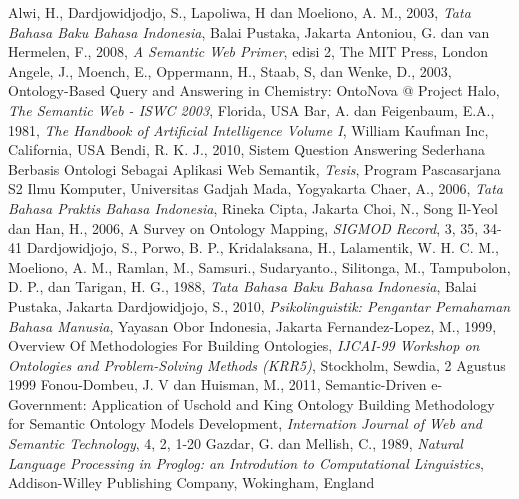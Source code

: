 \begin{thebibliography}{99}
		Alwi, H., Dardjowidjodjo, S., Lapoliwa, H dan Moeliono, A. M., 2003, \emph{Tata Bahasa Baku Bahasa Indonesia}, Balai Pustaka, Jakarta
		Antoniou, G. dan van Hermelen, F., 2008, \emph{A Semantic Web Primer}, edisi 2, The MIT Press, London
		Angele, J., Moench, E., Oppermann, H., Staab, S, dan Wenke, D., 2003, Ontology-Based Query and Answering in Chemistry: OntoNova @ Project Halo, \emph{The Semantic Web - ISWC 2003}, Florida, USA
		Bar, A. dan Feigenbaum, E.A., 1981, \emph{The Handbook of Artificial Intelligence Volume I}, William Kaufman Inc, California, USA
		Bendi, R. K. J., 2010, Sistem Question Answering Sederhana Berbasis Ontologi Sebagai Aplikasi Web Semantik, \emph{Tesis}, Program Pascasarjana S2 Ilmu Komputer, Universitas Gadjah Mada, Yogyakarta
		Chaer, A., 2006, \emph{Tata Bahasa Praktis Bahasa Indonesia}, Rineka Cipta, Jakarta
		Choi, N., Song Il-Yeol dan Han, H., 2006, A Survey on Ontology Mapping, \emph{SIGMOD Record}, 3, 35, 34-41
		Dardjowidjojo, S., Porwo, B. P., Kridalaksana, H., Lalamentik, W. H. C. M., Moeliono, A. M., Ramlan, M., Samsuri., Sudaryanto., Silitonga, M., Tampubolon, D. P., dan Tarigan, H. G., 1988, \emph{Tata Bahasa Baku Bahasa Indonesia}, Balai Pustaka, Jakarta
		Dardjowidjojo, S., 2010, \emph{Psikolinguistik: Pengantar Pemahaman Bahasa Manusia}, Yayasan Obor Indonesia, Jakarta
		Fernandez-Lopez, M., 1999, Overview Of Methodologies For Building Ontologies, \emph{IJCAI-99 Workshop on Ontologies and Problem-Solving Methods (KRR5)}, Stockholm, Sewdia, 2 Agustus 1999
		Fonou-Dombeu, J. V dan Huisman, M., 2011, Semantic-Driven e-Government: Application of Uschold and King Ontology Building Methodology for Semantic Ontology Models Development, \emph{Internation Journal of Web and Semantic Technology}, 4, 2, 1-20
		Gazdar, G. dan Mellish, C., 1989, \emph{Natural Language Processing in Proglog: an Introdution to Computational Linguistics}, Addison-Willey Publishing Company, Wokingham, England

\end{thebibliography}
